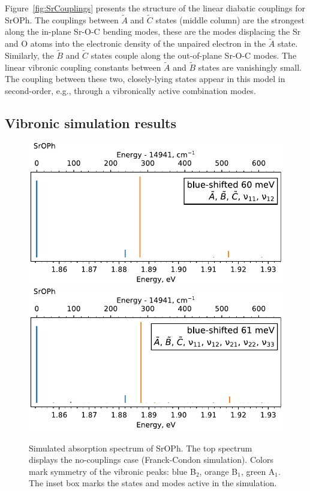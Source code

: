 \documentclass{article}
\begin{document}
Figure~\ref{fig:SrCouplings} presents the structure of the linear diabatic
couplings for SrOPh. The couplings between $\tilde{A}$ and $\tilde{C}$ states
(middle column) are the strongest along the in-plane Sr-O-C bending modes,
these are the modes displacing the Sr and O atoms into the electronic density
of the unpaired electron in the $\tilde{A}$ state. Similarly, the $\tilde{B}$
and $\tilde{C}$ states couple along the out-of-plane Sr-O-C modes. The linear
vibronic coupling constants between $\tilde{A}$ and $\tilde{B}$ states are
vanishingly small. The coupling between these two, closely-lying states appear
in this model in second-order, e.g., through a vibronically active combination
modes.

\subsection{Vibronic simulation results}
\label{sec:results:simulations}

\begin{figure}
    \begin{center}
        \includegraphics[width=12 cm]{figures/SrOPh_0t650_no_couplings.pdf}
        \includegraphics[width=12 cm]{figures/SrOPh_0t650.pdf}
    \end{center}
    \caption{
        Simulated absorption spectrum of SrOPh. The top spectrum displays the
        no-couplings case (Franck-Condon simulation). Colors mark symmetry of
        the vibronic peaks: blue B$_2$, orange B$_1$, green A$_1$. The inset
        box marks the states and modes active in the simulation.
    }
    \label{fig:SrOPh_0t650}
\end{figure}
\end{document}
